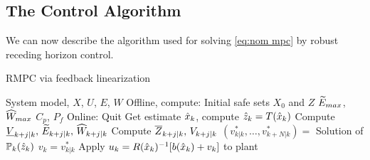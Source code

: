 \subsection{The Control Algorithm}
\label{sec:the control algo}
We can now describe the algorithm used for solving \eqref{eq:nom mpc} by robust receding horizon control.

\begin{algorithm}
	\caption{RMPC via feedback linearization}
\begin{algorithmic}
	\Require System model, $X$, $U$, $E$, $W$ 
	\State	Offline, compute:
	\State \quad Initial safe sets $X_0$ and $Z$ 
	\State \quad $\widetilde{E}_{max}$, $\widehat{W}_{max}$ 
	\State \quad $C_p$, $P_f$ 
	\State Online: 
	\State Quit
	\Else
	\State Get estimate $\hat{x}_{k}$, compute $\hat{z}_{k} = T(\hat{x}_{k})$
	\State Compute $\underline{V}_{k+j|k},\,\widetilde{E}_{k+j|k},\, \widehat{W}_{k+j|k}$ 
	\State Compute $\overline{Z}_{k+j|k},\,V_{k+j|k}$ 
	\State $(v^*_{k|k}, \ldots, v^*_{k+N|k}) = $ Solution of $\mathbb{P}_{k}(\hat{z}_{k})$ 
	\State $v_k = v^{*}_{k|k}$
	\State Apply $u_k = R(\hat{x}_{k})^{-1}[b(\hat{x}_{k})+v_k]$ to plant 
	\EndFor	
	\EndIf		
\end{algorithmic}
\label{alg:RMPC}
\end{algorithm}


